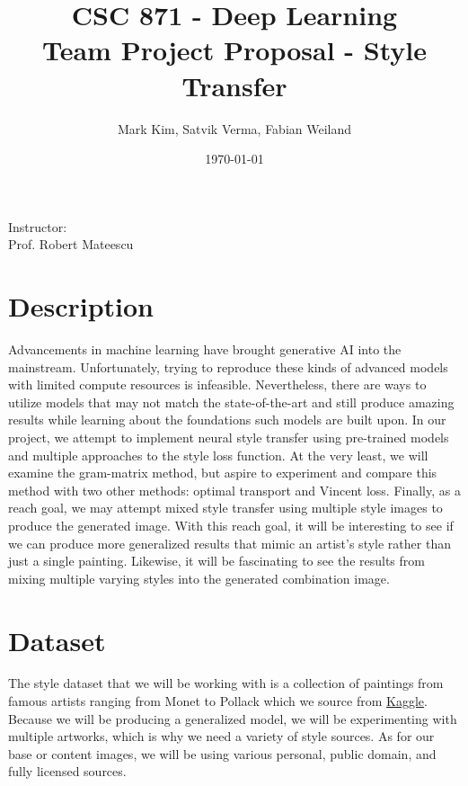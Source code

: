 \documentclass[12pt]{article}
\title{\textbf{CSC 871 - Deep Learning}\\\Large Team Project Proposal - Style Transfer}
\author{\large Mark Kim, Satvik Verma, Fabian Weiland}
\date{\today}
\begin{document}
\maketitle
\vspace{5mm}
\begin{center}
    Instructor:\\
    Prof. Robert Mateescu
\end{center}
\newpage

\section{Description}
Advancements in machine learning have brought generative AI into the mainstream.
Unfortunately, trying to reproduce these kinds of advanced models with limited
compute resources is infeasible.  Nevertheless, there are ways to utilize models
that may not match the state-of-the-art and still produce amazing results while
learning about the foundations such models are built upon.  In our project, we
attempt to implement neural style transfer using pre-trained models and multiple
approaches to the style loss function.  At the very least, we will examine the
gram-matrix method, but aspire to experiment and compare this method with two
other methods: optimal transport and Vincent loss.  Finally, as a reach goal, we
may attempt mixed style transfer using multiple style images to produce the
generated image.  With this reach goal, it will be interesting to see if we can
produce more generalized results that mimic an artist's style rather than just a
single painting.  Likewise, it will be fascinating to see the results from
mixing multiple varying styles into the generated combination image.

\section{Dataset}
The style dataset that we will be working with is a collection of paintings from famous
artists ranging from Monet to Pollack which we source from 
\href{https://www.kaggle.com/datasets/ikarus777/best-artworks-of-all-time}{Kaggle}.
Because we will be producing a generalized model, we will be experimenting with
multiple artworks, which is why we need a variety of style sources.  As for our
base or content images, we will be using various personal, public domain, and
fully licensed sources.
\end{document}
